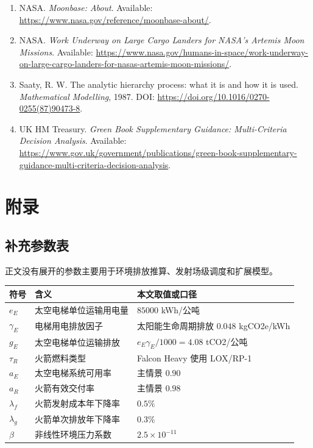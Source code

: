 \documentclass[12pt,a4paper,UTF8]{article}
\begin{document}
\begin{enumerate}
    \item[{[12]}] NASA. \textit{Moonbase: About}. Available: \url{https://www.nasa.gov/reference/moonbase-about/}.
    \item[{[13]}] NASA. \textit{Work Underway on Large Cargo Landers for NASA's Artemis Moon Missions}. Available: \url{https://www.nasa.gov/humans-in-space/work-underway-on-large-cargo-landers-for-nasas-artemis-moon-missions/}.
    \item[{[14]}] Saaty, R. W. The analytic hierarchy process: what it is and how it is used. \textit{Mathematical Modelling}, 1987. DOI: \url{https://doi.org/10.1016/0270-0255(87)90473-8}.
    \item[{[15]}] UK HM Treasury. \textit{Green Book Supplementary Guidance: Multi-Criteria Decision Analysis}. Available: \url{https://www.gov.uk/government/publications/green-book-supplementary-guidance-multi-criteria-decision-analysis}.
\end{enumerate}
\endgroup

\clearpage
\section{附录}
\label{app:appendix}

\subsection{补充参数表}
\label{app:params}

正文没有展开的参数主要用于环境排放推算、发射场级调度和扩展模型。

\begin{center}
\footnotesize
\renewcommand{\arraystretch}{1.22}
\begin{tabular}{p{}p{}p{}}
\toprule
符号 & 含义 & 本文取值或口径 \\
\midrule
\(e_E\) & 太空电梯单位运输用电量 & \(85000\) kWh/公吨 \\
\(\gamma_E\) & 电梯用电排放因子 & 太阳能生命周期排放 \(0.048\) kgCO2e/kWh \\
\(g_E\) & 太空电梯单位运输排放 & \(e_E\gamma_E/1000=4.08\) tCO2/公吨 \\
\(\tau_R\) & 火箭燃料类型 & Falcon Heavy 使用 LOX/RP-1 \\
\(a_E\) & 太空电梯系统可用率 & 主情景 \(0.90\) \\
\(a_R\) & 火箭有效交付率 & 主情景 \(0.98\) \\
\(\lambda_f\) & 火箭发射成本年下降率 & \(0.5\%\) \\
\(\lambda_g\) & 火箭单次排放年下降率 & \(0.3\%\) \\
\(\beta\) & 非线性环境压力系数 & \(2.5\times10^{-11}\) \\
\bottomrule
\end{tabular}
\end{center}
\end{document}
